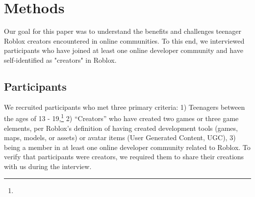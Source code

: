 \section{Methods}
Our goal for this paper was to understand the benefits and challenges teenager Roblox creators encountered in online communities. To this end, we interviewed participants who have joined at least one online developer community and have self-identified as "creators" in Roblox.

\subsection{Participants}
We recruited participants who met three primary criteria: 1) Teenagers between the ages of 13 - 19,\footnote{} 2) ``Creators'' who have created two games or three game elements, per Roblox's definition of having created development tools (games, maps, models, or assets) or avatar items (User Generated Content, UGC), 3) being a member in at least one online developer community related to Roblox.  To verify that participants were creators, we required them to share their creations with us during the interview.

